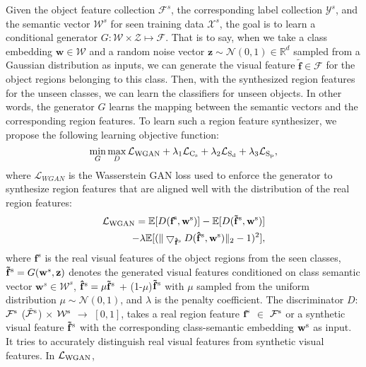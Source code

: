 \documentclass[10pt,twocolumn,letterpaper]{article}
\begin{document}
Given the object feature collection $\mathcal{F}^s$, the corresponding label collection $\mathcal{Y}^s$, and the semantic vector $\mathcal{W}^s$ for seen training data $\mathcal{X}^s$, the goal is to learn a conditional generator ${G}: \mathcal{W}\times \mathcal{Z}\mapsto \mathcal{F}$. That is to say, when we take a class embedding $\textbf{w}\in \mathcal{W}$ and a random noise vector $\textbf{z}\sim\mathcal{N}(0,1)\in \mathbb{R}^d$ sampled from a Gaussian distribution as inputs, we can generate the visual feature $\tilde{\textbf{f}}\in \mathcal{F}$ for the object regions belonging to this class. Then, with the synthesized region features for the unseen classes, we can learn the classifiers for unseen objects. In other words, the generator $G$ learns the mapping between the semantic vectors and the corresponding region features. To learn such a region feature synthesizer, we propose the following learning objective function:
\begin{equation}
\mathop{\min}\limits_{G}\mathop{\max}\limits_{D}\mathcal{L}_{\rm WGAN}+\lambda_{1} \mathcal{L}_{\rm C_s} + \lambda_{2} \mathcal{L}_{\rm S_d} +\lambda_{3} \mathcal{L}_{\rm S_p},
\label{overallLoss}
\end{equation}
where $\mathcal{L}_{WGAN}$ is the Wasserstein GAN loss \cite{arjovsky2017wasserstein} used to enforce the generator to synthesize region features that are aligned well with the distribution of the real region features:
\begin{equation}
\setlength{\abovedisplayskip}{1.8pt}
\begin{split}
\mathcal{L}_{\rm WGAN}=\mathbb{E}[D(\textbf{f}^{\rm s}, \textbf{w}^{\rm s})]-\mathbb{E}[D(\mathbf{\tilde{f}}^{\rm s}, \textbf{w}^{\rm s})]\\
-\lambda \mathbb{E}[(\|\bigtriangledown_{\mathbf{\hat{f}}^{\rm s}}D(\mathbf{\hat{f}}^{\rm s}, \textbf{w}^{\rm s})\|_{2}-1)^{2}],
\end{split}
\label{wganloss}
\end{equation}
where $\mathbf{f}^s$ is the real visual features of the object regions from the seen classes, $\mathbf{\tilde{f}}^{\rm s} = {G}(\textbf{w}^s,\textbf{z})$ denotes the generated visual features conditioned on class semantic vector $\textbf{w}^s\in \mathcal{W}^s$, $\mathbf{\hat{f}}^{\rm s} = \mu \mathbf{\tilde{f}}^{\rm s}$ + (1-$\mu$)$\mathbf{\tilde{f}}^{\rm s}$ with $\mu$ sampled from the uniform distribution $\mu \sim \mathcal{N}(0,1)$, and $\lambda$ is the penalty coefficient.
The discriminator $D$: $\mathcal{F}^{\rm s}$ ($\mathcal{\tilde{F}}^{\rm s}$) $\times$ $\mathcal{W}^{\rm s}$ $\rightarrow$ $[0, 1]$, takes a real region feature $\textbf{f}^{\rm s}$ $\in$ $\mathcal{F}^{\rm s}$ or a synthetic visual feature $\mathbf{\tilde{f}}^{\rm s}$ with the corresponding class-semantic embedding $\textbf{w}^{\rm s}$ as input. It tries to accurately distinguish real visual features from synthetic visual features. In $\mathcal{L}_{\rm WGAN}$,
\end{document}
